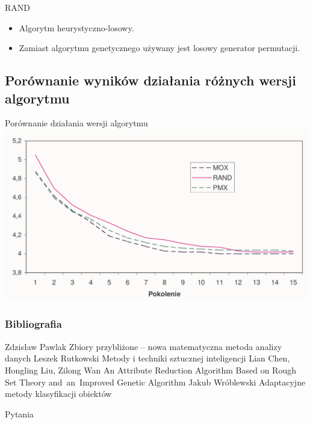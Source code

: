 \documentclass[10pt]{beamer}
\begin{document}
\begin{frame}{RAND}
\begin{itemize}
\item Algorytm heurystyczno-losowy.
\item Zamiast algorytmu genetycznego używany jest losowy generator permutacji.
\end{itemize}

\end{frame}


\subsection{Porównanie wyników działania różnych wersji algorytmu}

\begin{frame}{Porównanie działania wersji algorytmu}
\includegraphics[width=1\textwidth]{Grafiki/wykresJW.png}
\end{frame}






\begin{frame}
\frametitle{Bibliografia}
\footnotesize
{
\begin{thebibliography}{99}
 Zdzisław Pawlak
\newblock Zbiory przybliżone -- nowa matematyczna metoda analizy danych 
 Leszek Rutkowski
\newblock Metody i techniki sztucznej inteligencji
 Lian Chen, Hongling Liu, Zilong Wan
\newblock An Attribute Reduction Algorithm Based on Rough Set Theory
and~an~Improved Genetic Algorithm
 Jakub Wróblewski
\newblock Adaptacyjne metody klasyfikacji obiektów
\end{thebibliography}
}
\end{frame}


{\1
\begin{frame}
  \finalpage
  {
  \begin{huge}
  	Pytania
  \end{huge}
  
  }
\end{frame}
}
\end{document}
